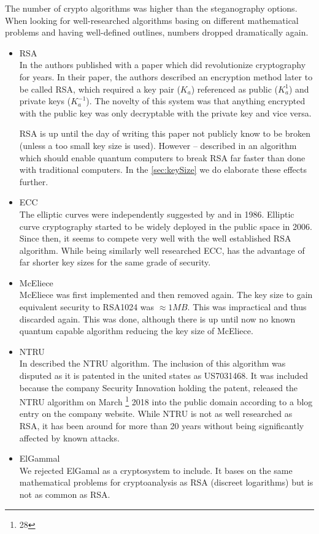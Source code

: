 The number of crypto algorithms was higher than the steganography options. When looking for well-researched algorithms basing on different mathematical problems and having well-defined outlines, numbers dropped dramatically again.

\begin{itemize}
	\item RSA\\
	In \citeyear{Rivest:1978:MOD:359340.359342} the authors \citeauthor{Rivest:1978:MOD:359340.359342} published with \cite{Rivest:1978:MOD:359340.359342} a paper which did revolutionize cryptography for years. In their paper, the authors described an encryption method later to be called RSA, which required a key pair ($K_a$) referenced as public ($K^{1}_a$) and private keys ($K^{-1}_a$). The novelty of this system was that anything encrypted with the public key was only decryptable with the private key and vice versa.
	
	RSA is up until the day of writing this paper not publicly know to be broken (unless a too small key size is used). However -- \citeauthor{Shor97polynomial-timealgorithms} described in \citeyear{Shor97polynomial-timealgorithms} an algorithm which should enable quantum computers to break RSA far faster than done with traditional computers. In the \cref{sec:keySize} we do elaborate these effects further.
	\item ECC\\
	The elliptic curves were independently suggested by \cite{Miller1986} and \cite{Koblitz04guideto} in 1986. Elliptic curve cryptography started to be widely deployed in the public space in 2006. Since then, it seems to compete very well with the well established RSA algorithm. While being similarly well researched ECC, has the advantage of far shorter key sizes for the same grade of security.
	\item McEliece\\
	McEliece was first implemented and then removed again. The key size to gain equivalent security to RSA1024 was $\approx 1MB$. This was impractical and thus discarded again. This was done, although there is up until now no known quantum capable algorithm reducing the key size of McEliece.
	\item NTRU\\
	In \cite{Hoffstein1998} \citeauthor{Hoffstein1998} described the NTRU algorithm. The inclusion of this algorithm was disputed as it is patented in the united states as US7031468. It was included because the company Security Innovation holding the patent, released the NTRU algorithm on March \thanks{28} 2018 into the public domain according to a blog entry on the company website. While NTRU is not as well researched as RSA, it has been around for more than 20 years without being significantly affected by known attacks.
	\item ElGammal\\
	We rejected ElGamal as a cryptosystem to include. It bases on the same mathematical problems for cryptoanalysis as RSA (discreet logarithms) but is not as common as RSA.
\end{itemize}


